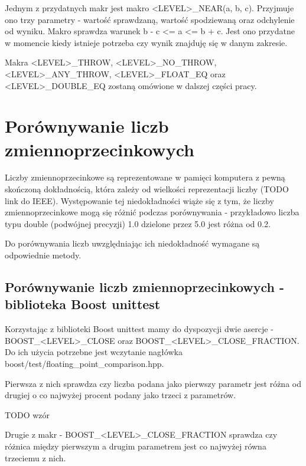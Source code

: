 \documentclass[12pt,a4paper,notitlepage]{report}
\begin{document}
Jednym z przydatnych makr jest makro <LEVEL>{\_}NEAR(a, b, c). Przyjmuje ono trzy parametry - wartość sprawdzaną, wartość spodziewaną oraz odchylenie od wyniku. Makro sprawdza warunek b - c <= a <= b + c. Jest ono przydatne w momencie kiedy istnieje potrzeba czy wynik znajduję się w danym zakresie.

Makra <LEVEL>{\_}THROW, <LEVEL>{\_}NO{\_}THROW, <LEVEL>{\_}ANY{\_}THROW, <LEVEL>{\_}FLOAT{\_}EQ oraz <LEVEL>{\_}DOUBLE{\_}EQ zostaną omówione w dalszej części pracy.

			

\chapter{Porównywanie liczb zmiennoprzecinkowych}

Liczby zmiennoprzecinkowe są reprezentowane w pamięci komputera z pewną skończoną dokładnością, która zależy od wielkości reprezentacji liczby (TODO link do IEEE). Występowanie tej niedokładności wiąże się z tym, że liczby zmiennoprzecinkowe mogą się różnić podczas porównywania - przykładowo liczba typu double (podwójnej precyzji) 1.0 dzielone przez 5.0 jest różna od 0.2.

Do porównywania liczb uwzględniając ich niedokładność wymagane są odpowiednie metody.

\section{Porównywanie liczb zmiennoprzecinkowych - biblioteka Boost unittest}

Korzystając z biblioteki Boost unittest mamy do dyspozycji dwie asercje - BOOST{\_}<LEVEL>{\_}CLOSE oraz BOOST{\_}<LEVEL>{\_}CLOSE{\_}FRACTION. Do ich użycia potrzebne jest wczytanie nagłówka boost/test/floating{\_}point{\_}comparison.hpp.

Pierwsza z nich sprawdza czy liczba podana jako pierwszy parametr jest różna od drugiej o co najwyżej procent podany jako trzeci z parametrów.

TODO wzór

Drugie z makr - BOOST{\_}<LEVEL>{\_}CLOSE{\_}FRACTION sprawdza czy różnica między pierwszym a drugim parametrem jest co najwyżej równa trzeciemu z nich.
\end{document}
